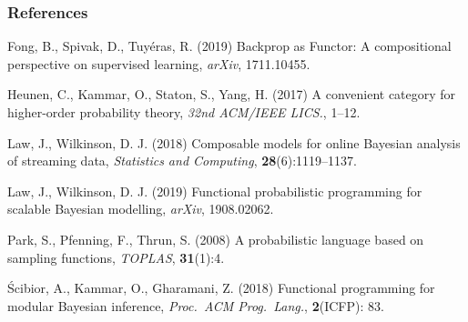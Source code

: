 \documentclass[mathserif,handout]{beamer}
\begin{document}
\begin{frame}
  \frametitle{References}

  
  \begin{thebibliography}{}


\bibitem{} Fong, B., Spivak, D., Tuy\'eras, R. (2019) \alert{Backprop as Functor: A compositional perspective on supervised learning}, \emph{arXiv}, 1711.10455.
   

\bibitem{} Heunen, C., Kammar, O., Staton, S., Yang, H. (2017) \alert{A convenient category for higher-order probability theory}, \emph{32nd ACM/IEEE LICS.}, 1--12.
     
    \bibitem{} Law, J., Wilkinson, D. J. (2018) \alert{Composable models for online Bayesian analysis of streaming data}, \emph{Statistics and Computing}, \textbf{28}(6):1119--1137.

      \bibitem{} Law, J., Wilkinson, D. J. (2019) \alert{Functional probabilistic programming for scalable Bayesian modelling}, \emph{arXiv}, 1908.02062.
      

    \bibitem{} Park, S., Pfenning, F., Thrun, S. (2008) \alert{A probabilistic language based on sampling functions}, \emph{TOPLAS}, \textbf{31}(1):4.


\bibitem{} \'{S}cibior, A., Kammar, O., Gharamani, Z. (2018) \alert{Functional programming for modular Bayesian inference}, \emph{Proc.\ ACM Prog.\ Lang.}, \textbf{2}(ICFP): 83.
      

\end{thebibliography}
\end{frame}
\end{document}
